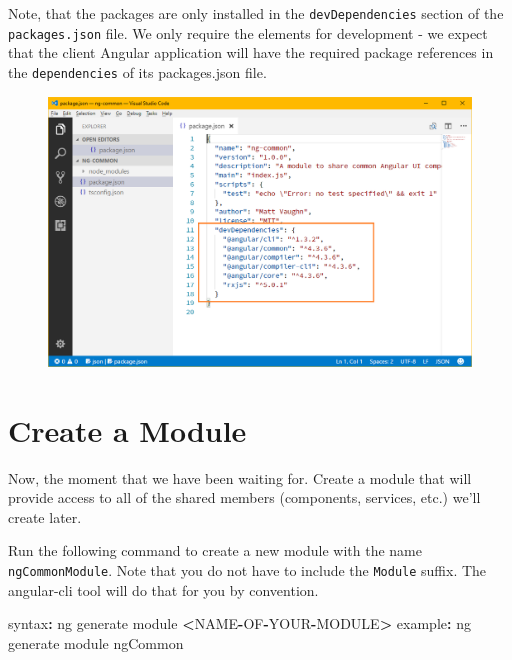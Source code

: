 \documentclass[]{book}
\newenvironment{Shaded}{\begin{snugshade}}{\end{snugshade}}
\newcommand{\OperatorTok}[1]{\textcolor[rgb]{0.81,0.36,0.00}{\textbf{#1}}}
\newcommand{\NormalTok}[1]{#1}
\theoremstyle{definition}
\theoremstyle{definition}
\theoremstyle{definition}
\theoremstyle{remark}
\begin{document}
Note, that the packages are only installed in the
\texttt{devDependencies} section of the \texttt{packages.json} file. We
only require the elements for development - we expect that the client
Angular application will have the required package references in the
\texttt{dependencies} of its packages.json file.

\begin{figure}
\centering
\includegraphics{images/ng-dev-dependencies.png}
\caption{}
\end{figure}

\chapter{Create a Module}\label{create-a-module}

Now, the moment that we have been waiting for. Create a module that will
provide access to all of the shared members (components, services, etc.)
we'll create later.

Run the following command to create a new module with the name
\texttt{ngCommonModule}. Note that you do not have to include the
\texttt{Module} suffix. The angular-cli tool will do that for you by
convention.

\begin{Shaded}
\begin{Highlighting}[]
\NormalTok{syntax}\OperatorTok{:}\NormalTok{ ng generate module }\OperatorTok{<}\NormalTok{NAME}\OperatorTok{-}\NormalTok{OF}\OperatorTok{-}\NormalTok{YOUR}\OperatorTok{-}\NormalTok{MODULE}\OperatorTok{>}
\NormalTok{example}\OperatorTok{:}\NormalTok{ ng generate module ngCommon}
\end{Highlighting}
\end{Shaded}
\end{document}
